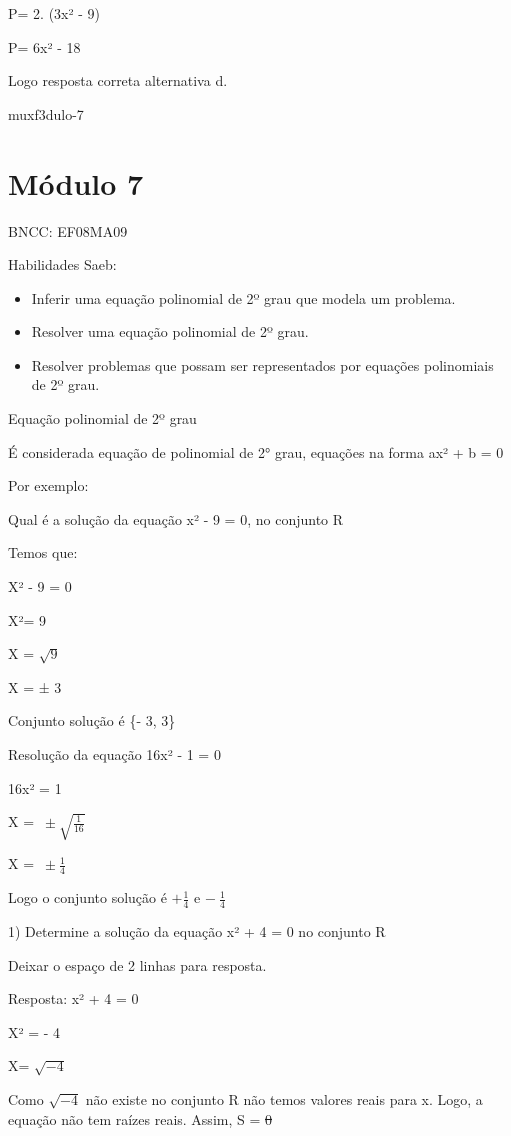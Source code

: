 {P= 2. (3x² - 9)

P= 6x² - 18

Logo resposta correta alternativa d.

muxf3dulo-7}{%
\section{Módulo 7}

BNCC: EF08MA09

Habilidades Saeb:

\begin{itemize}
\item
  Inferir uma equação polinomial de 2º grau que modela um problema.
\item
  Resolver uma equação polinomial de 2º grau.
\item
  Resolver problemas que possam ser representados por equações
  polinomiais de 2º grau.
\end{itemize}

Equação polinomial de 2º grau

É considerada equação de polinomial de 2° grau, equações na forma ax² +
b = 0

Por exemplo:

Qual é a solução da equação x² - 9 = 0, no conjunto R

Temos que:

X² - 9 = 0

X²= 9

X = \(\sqrt{9}\)

X = ± 3

Conjunto solução é \{- 3, 3\}

Resolução da equação 16x² - 1 = 0

16x² = 1

X = \(\  \pm \sqrt{\frac{1}{16}}\)

X = \(\  \pm \frac{1}{4}\)

Logo o conjunto solução é \(+ \frac{1}{4}\) e \(- \ \frac{1}{4}\)


1) Determine a solução da equação x² + 4 = 0 no conjunto R

Deixar o espaço de 2 linhas para resposta.

Resposta: x² + 4 = 0

X² = - 4

X= \(\sqrt{- 4}\)

Como \(\sqrt{- 4}\) não existe no conjunto R não temos valores reais
para x. Logo, a equação não tem raízes reais. Assim, S = \sout{0}

}
